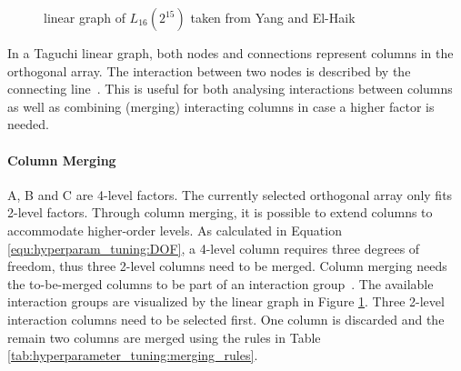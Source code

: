 \begin{figure}[H]
	\centering
	\caption{linear graph of $L_{16}(2^{15})$ taken from Yang and El-Haik~\cite{yang_design_2009}}
	\label{fig:hyperparameter_tuning:linear_graph}
\end{figure}

In a Taguchi linear graph, both nodes and connections represent columns in the orthogonal array. The interaction between two nodes is described by the connecting line~\cite{taguchi_taguchis_2005}. This is useful for both analysing interactions between columns as well as combining (merging) interacting columns in case a higher factor is needed.

\paragraph{Column Merging}
A, B and C are 4-level factors. The currently selected orthogonal array only fits 2-level factors. Through column merging, it is possible to extend columns to accommodate higher-order levels. As calculated in Equation \ref{equ:hyperparam_tuning:DOF}, a 4-level column requires three degrees of freedom, thus three 2-level columns need to be merged. Column merging needs the to-be-merged columns to be part of an interaction group~\cite{yang_design_2009}. The available interaction groups are visualized by the linear graph in Figure \ref{fig:hyperparameter_tuning:linear_graph}. Three 2-level interaction columns need to be selected first. One column is discarded and the remain two columns are merged using the rules in Table \ref{tab:hyperparameter_tuning:merging_rules}.

